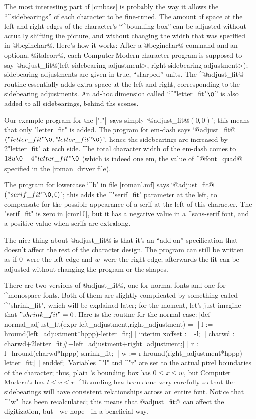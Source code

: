 The most interesting part of |cmbase| is probably the way it allows the
``^{side\-bearings}'' of each character to be fine-tuned. The amount of
space at the left and right edges of the character's ``^{bounding box}''
can be adjusted without actually shifting the picture, and without
changing the width that was specified in @beginchar@. Here's how it works:
After a @beginchar@ command and an optional @italcorr@, each Computer
Modern character program is supposed to say
\begindisplay
@adjust\_fit@(\<left sidebearing adjustment>,\thinspace
  \<right sidebearing adjustment>);
\enddisplay
sidebearing adjustments are given in true, ``sharped'' units.
The ^@adjust\_fit@ routine essentially adds extra space at the left
and right, corresponding to the sidebearing adjustments. An ad-hoc
dimension called ``^"letter\_fit"$\0$'' is also added to all sidebearings,
behind the scenes.

Our example program for the |"."|\ says simply `@adjust\_fit@$(0,0)$';
this means that only "letter\_fit" is added. The program for em-dash
says `@adjust\_fit@$("letter\_fit"\0,\allowbreak"letter\_fit"\0)$', hence
the sidebearings are increased by 2"letter\_fit" at each side.
The total character width of the em-dash comes to $18u\0+
4"letter\_fit"\0$ (which is indeed one em, the value of ^@font\_quad@
specified in the |roman| driver file).

The program for lowercase `^{b}' in file |romanl.mf| says
`@adjust\_fit@$("serif\_fit"\0,0)$'; this adds the ^"serif\_fit"
parameter at the left, to compensate for the possible appearance
of a serif at the left of this character. The "serif\_fit" is
zero in |cmr10|, but it has a negative value in a ^{sans-serif} font,
and a positive value when serifs are extralong.

The nice thing about @adjust\_fit@ is that it's an ``add-on''
specification that doesn't affect the rest of the character design.
The program can still be written as if 0~were the left edge and
$w$~were the right edge; afterwards the fit can be adjusted without
changing the program or the shapes.

There are two versions of @adjust\_fit@, one for normal fonts
and one for ^{mono\-space} fonts. Both of them are slightly complicated
by something called ^"shrink\_fit", which will be explained later;
for the moment, let's just imagine that $"shrink\_fit"=0$. Here is the
routine for the normal case:
\beginlines
|def normal_adjust_fit(expr left_adjustment,right_adjustment) =|
| l := -hround(left_adjustment*hppp)-letter_fit;|
| interim xoffset := -l;|
| charwd := charwd+2letter_fit#+left_adjustment+right_adjustment;|
| r := l+hround(charwd*hppp)-shrink_fit;|
| w := r-hround(right_adjustment*hppp)-letter_fit;|
| enddef;|
\endlines
Variables ^"l" and ^"r" are set to the actual pixel boundaries of the
character; thus, plain \MF's bounding box has $0\le x\le w$, but
Computer Modern's has $l\le x\le r$. ^{Rounding} has been done
very carefully so that the sidebearings will have consistent
relationships across an entire font. Notice that ^"w"~has been
recalculated; this means that @adjust\_fit@ can affect the digitization,
but---we hope---in a beneficial way.

